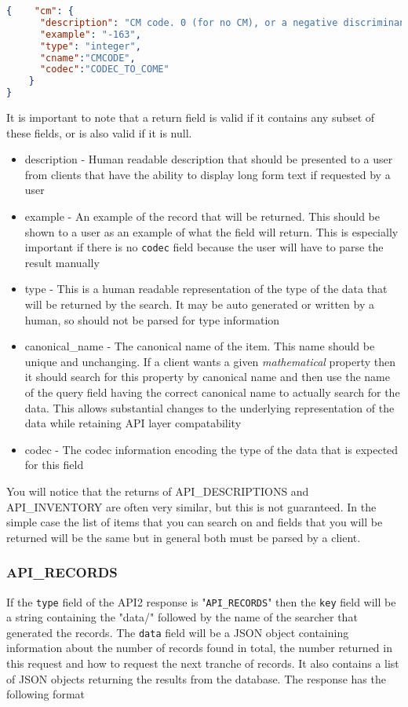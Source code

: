 \documentclass[11pt]{article}
\begin{document}
\begin{lstlisting}[language=json,firstnumber=1]
{    "cm": {
      "description": "CM code. 0 (for no CM), or a negative discriminant", 
      "example": "-163", 
      "type": "integer",
      "cname":"CMCODE",
      "codec":"CODEC_TO_COME"
    }
}
\end{lstlisting}
It is important to note that a return field is valid if it contains any subset of these fields, or is also valid if it is null.
\begin{itemize}
\item description - Human readable description that should be presented to a user from clients that have the ability to display long form text if requested by a user
\item example - An example of the record that will be returned. This should be shown to a user as an example of what the field will return. This is especially important if there is no \texttt{codec} field because the user will have to parse the result manually
\item type - This is a human readable representation of the type of the data that will be returned by the search. It may be auto generated or written by a human, so should not be parsed for type information
\item canonical\_name - The canonical name of the item. This name should be unique and unchanging. If a client wants a given {\it mathematical} property then it should search for this property by canonical name and then use the name of the query field having the correct canonical name to actually search for the data. This allows substantial changes to the underlying representation of the data while retaining API layer compatability
\item codec - The codec information encoding the type of the data that is expected for this field
\end{itemize}

You will notice that the returns of API\_DESCRIPTIONS and API\_INVENTORY are often very similar, but this is not guaranteed. In the simple case the list of items that you can search on and fields that you will be returned will be the same but in general both must be parsed by a client.

\subsubsection{API\_RECORDS}
If the \texttt{type} field of the API2 response is "\texttt{API\_RECORDS}" then the \texttt{key} field will be a string containing the "data/" followed by the name of the searcher that generated the records. The \texttt{data} field will be a JSON object containing information about the number of records found in total, the number returned in this request and how to request the next tranche of records. It also contains a list of JSON objects returning the results from the database. The response has the following format
\end{document}
